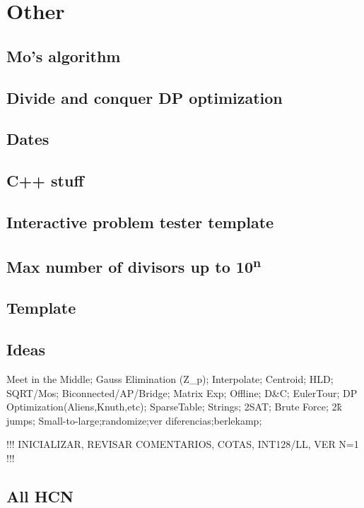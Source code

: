 \section{Other}
\subsection{Mo's algorithm}
\subsection{Divide and conquer DP optimization}
\subsection{Dates}
\subsection{C++ stuff}
\subsection{Interactive problem tester template}
\subsection{Max number of divisors up to 10\textsuperscript{n}}
\subsection{Template}

\subsection{Ideas}
Meet in the Middle; Gauss Elimination (Z\_p); Interpolate; Centroid; HLD;
SQRT/Mos; Biconnected/AP/Bridge; Matrix Exp; Offline; D\&C; EulerTour;
DP Optimization(Aliens,Knuth,etc); SparseTable; Strings; 2SAT;
Brute Force; 2\^k jumps;
Small-to-large;randomize;ver diferencias;berlekamp;

!!! INICIALIZAR, REVISAR COMENTARIOS, COTAS, INT128/LL, VER N=1 !!!

\subsection{All HCN}



